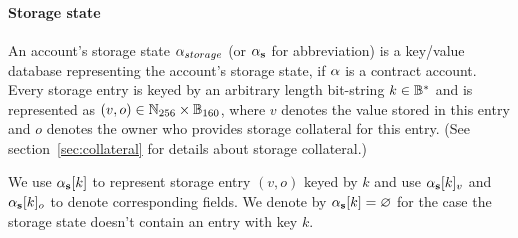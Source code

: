 \paragraph{Storage state}

An account's storage state $\mathbf{\alpha}_{storage}$ (or $\mathbf{\alpha}_{\bf s}$ for abbreviation) is a key/value database representing the account's storage state, if $\mathbf{\alpha}$ is a contract account. 
%
Every storage entry is keyed by an arbitrary length bit-string $k\in \mathbb{B}^{*}$ and is represented as $(v,o)\in \mathbb{N}_{256}\times \mathbb{B}_{160}$, where $v$ denotes the value stored in this entry and $o$ denotes the owner who provides storage collateral for this entry. (See section~\ref{sec:collateral} for details about storage collateral.)

We use $\mathbf{\alpha}_{\bf s}[k]$ to represent storage entry $(v,o)$ keyed by $k$ and use $\mathbf{\alpha}_{\bf s}[k]_v$ and $\mathbf{\alpha}_{\bf s}[k]_o$ to denote corresponding fields. We denote by $\mathbf{\alpha}_{\bf s}[k]=\varnothing$ for the case the storage state doesn't contain an entry with key $k$. 




